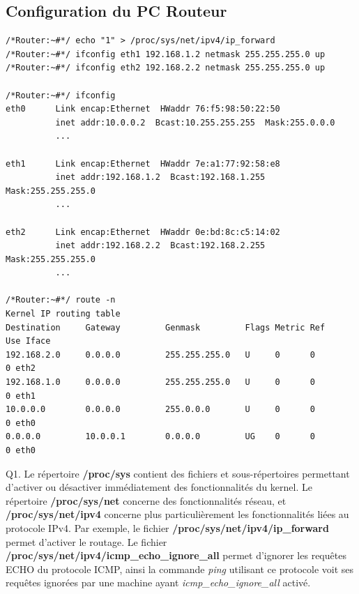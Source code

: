 \documentclass[frenchb, 11pt]{article}
\newlength{\leftbarwidth}
\newlength{\leftbarsep}
\newcommand*{\leftbarcolorcmd}{\color{leftbarcolor}} %
\renewenvironment{leftbar}{%
    \def\FrameCommand{{\leftbarcolorcmd{\vrule width \leftbarwidth\relax\hspace {\leftbarsep}}}}%
    \MakeFramed {\advance \hsize -\width \FrameRestore }%
}{%
    \endMakeFramed
}
\begin{document}
\subsection{Configuration du PC Routeur}
\begin{lstlisting}
/*Router:~#*/ echo "1" > /proc/sys/net/ipv4/ip_forward
/*Router:~#*/ ifconfig eth1 192.168.1.2 netmask 255.255.255.0 up
/*Router:~#*/ ifconfig eth2 192.168.2.2 netmask 255.255.255.0 up

/*Router:~#*/ ifconfig
eth0      Link encap:Ethernet  HWaddr 76:f5:98:50:22:50
          inet addr:10.0.0.2  Bcast:10.255.255.255  Mask:255.0.0.0
          ...

eth1      Link encap:Ethernet  HWaddr 7e:a1:77:92:58:e8
          inet addr:192.168.1.2  Bcast:192.168.1.255  Mask:255.255.255.0
          ...

eth2      Link encap:Ethernet  HWaddr 0e:bd:8c:c5:14:02
          inet addr:192.168.2.2  Bcast:192.168.2.255  Mask:255.255.255.0
          ...

/*Router:~#*/ route -n
Kernel IP routing table
Destination     Gateway         Genmask         Flags Metric Ref    Use Iface
192.168.2.0     0.0.0.0         255.255.255.0   U     0      0        0 eth2
192.168.1.0     0.0.0.0         255.255.255.0   U     0      0        0 eth1
10.0.0.0        0.0.0.0         255.0.0.0       U     0      0        0 eth0
0.0.0.0         10.0.0.1        0.0.0.0         UG    0      0        0 eth0
\end{lstlisting}
\hfill

\begin{leftbar}
\noindent Q1. Le répertoire \textbf{/proc/sys} contient des fichiers et sous-répertoires permettant d'activer ou désactiver immédiatement des fonctionnalités du kernel. Le répertoire \textbf{/proc/sys/net} concerne des fonctionnalités réseau, et \textbf{/proc/sys/net/ipv4} concerne plus particulièrement les fonctionnalités liées au protocole IPv4. Par exemple, le fichier \textbf{/proc/sys/net/ipv4/ip\_forward} permet d'activer le routage. Le fichier \textbf{/proc/sys/net/ipv4/icmp\_echo\_ignore\_all} permet d'ignorer les requêtes ECHO du protocole ICMP, ainsi la commande \emph{ping} utilisant ce protocole voit ses requêtes ignorées par une machine ayant \emph{icmp\_echo\_ignore\_all} activé.
\end{leftbar}
\end{document}
